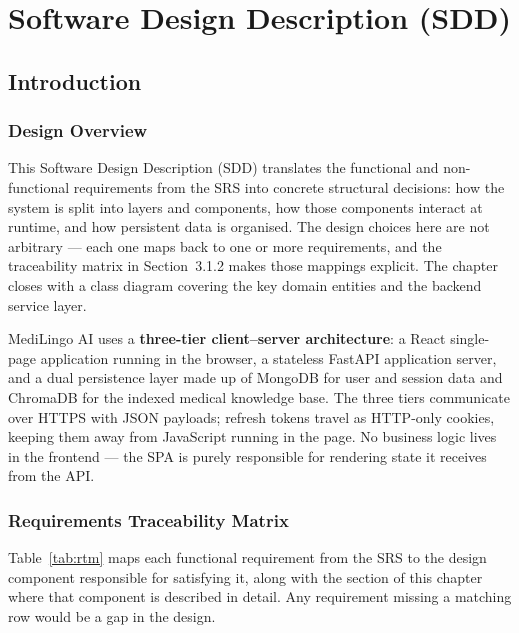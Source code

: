 
\chapter{Software Design Description (SDD)}

\section{Introduction}

\subsection{Design Overview}

This Software Design Description (SDD) translates the functional and non-functional
requirements from the SRS into concrete structural decisions: how the system is split into
layers and components, how those components interact at runtime, and how persistent data
is organised. The design choices here are not arbitrary --- each one maps back to one or
more requirements, and the traceability matrix in Section~3.1.2 makes those mappings
explicit. The chapter closes with a class diagram covering the key domain entities and
the backend service layer.

MediLingo AI uses a \textbf{three-tier client--server architecture}: a React single-page
application running in the browser, a stateless FastAPI application server, and a dual
persistence layer made up of MongoDB for user and session data and ChromaDB for the indexed
medical knowledge base. The three tiers communicate over HTTPS with JSON payloads; refresh
tokens travel as HTTP-only cookies, keeping them away from JavaScript running in the page.
No business logic lives in the frontend --- the SPA is purely responsible for rendering
state it receives from the API.

\subsection{Requirements Traceability Matrix}

Table~\ref{tab:rtm} maps each functional requirement from the SRS to the design component
responsible for satisfying it, along with the section of this chapter where that component
is described in detail. Any requirement missing a matching row would be a gap in the design.

